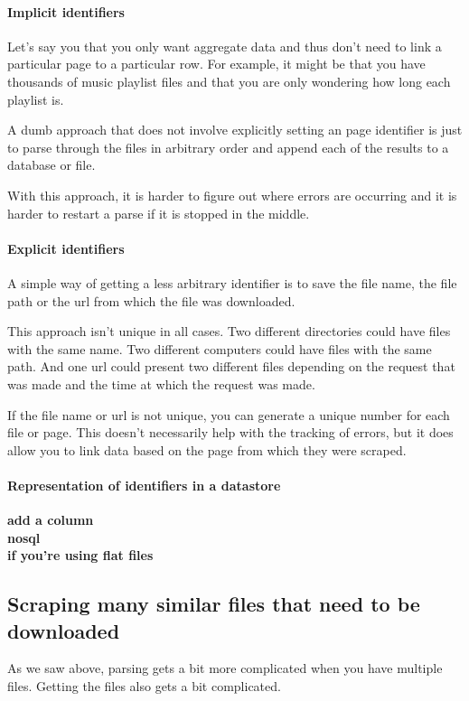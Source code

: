 \documentclass{article}
\newcommand\todo[1]{\textbf{#1}}
\begin{document}
\paragraph{Implicit identifiers}
Let's say you that you only want aggregate data and thus don't need to link
a particular page to a particular row. For example, it might be that you have
thousands of music playlist files and that you are only wondering how long
each playlist is.

A dumb approach that does not involve explicitly setting an page identifier
is just to parse through the files in arbitrary order and append each of the
results to a database or file.

With this approach, it is harder to figure out where errors are occurring
and it is harder to restart a parse if it is stopped in the middle.

\paragraph{Explicit identifiers}
A simple way of getting a less arbitrary identifier is to save the file name,
the file path or the url from which the file was downloaded.

This approach isn't unique in all cases. Two different directories could
have files with the same name. Two different computers could have files with
the same path. And one url could present two different files depending on
the request that was made and the time at which the request was made.

If the file name or url is not unique, you can generate a unique number
for each file or page. This doesn't necessarily help with the tracking of
errors, but it does allow you to link data based on the page from which
they were scraped.

\paragraph{Representation of identifiers in a datastore}
\todo{
add a column\\
nosql\\
if you're using flat files
}

\subsection{Scraping many similar files that need to be downloaded}\label{sec:many_to_download}
As we saw above, parsing gets a bit more complicated when you have multiple files.
Getting the files also gets a bit complicated.
\end{document}
